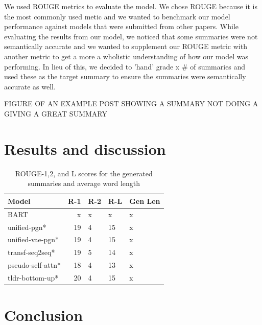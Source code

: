 \documentclass[11pt,a4paper, twocolumn]{article}
\begin{document}
We used ROUGE metrics to evaluate the model. We chose ROUGE because it is the most commonly used metic and we wanted to benchmark our model performance against models that were submitted from other papers. While evaluating the results from our model, we noticed that some summaries were not semantically accurate and we wanted to supplement our ROUGE metric with another metric to get a more a wholistic understanding of how our model was performing. In lieu of this, we decided to 'hand' grade x # of summaries and used these as the target summary to ensure the summaries were semantically accurate as well. 


FIGURE OF AN EXAMPLE POST SHOWING A SUMMARY NOT DOING A GIVING A GREAT SUMMARY


\section{Results and discussion}

\begin{table}
\centering
\begin{tabular}{lrlll}
\hline \textbf{Model} & \textbf{R-1} & \textbf{R-2} & \textbf{R-L} & \textbf{Gen Len} \\ \hline
BART & x & x & x & x \\
unified-pgn* & 19 & 4 & 15 & x \\
unified-vae-pgn* & 19 & 4 & 15 & x \\
transf-seq2seq* & 19 & 5 & 14 & x \\
pseudo-self-attn* & 18 & 4 & 13 & x \\
tldr-bottom-up* & 20 & 4  & 15 & x\\
\hline
\end{tabular}
\caption{\label{font-table} ROUGE-1,2, and L scores for the generated summaries and average word length}
\end{table}

\section{Conclusion}
\end{document}
